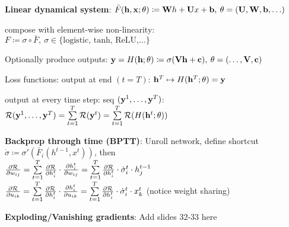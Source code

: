     \textbf{Linear dynamical system}: $\bar{F}(\mathbf h,\mathbf x;\theta)\coloneqq\mathbf W h+\mathbf U x + \mathbf b,\>\theta=(\mathbf U,\mathbf W,\mathbf b,\ldots)$
    
    compose with element-wise non-linearity:\\ \tab$F\coloneqq\sigma\circ\bar{F},\>\sigma\in\{\text{logistic, tanh, ReLU,\ldots}\}$
    
    Optionally produce outputs: $\mathbf y=H(\mathbf h;\theta)\coloneqq\sigma(\mathbf V\mathbf h+\mathbf c),\>\theta=(\ldots,\mathbf V,\mathbf c)$
    
    Loss functions: output at end $(t=T)$: $\mathbf h^T\mapsto H(\mathbf h^T;\theta)=\mathbf y$
    
    output at every time step: seq $(\mathbf y^1,\ldots,\mathbf y^T)$:\\ \tab$\mathcal{R}(\mathbf y^1,\ldots,\mathbf y^T)=\sum\limits^T_{t=1}\mathcal{R}(\mathbf y^t)=\sum\limits^T_{t=1}\mathcal{R}(H(\mathbf h^t;\theta))$
    
    \textbf{Backprop through time (BPTT)}: Unroll network, define shortcut\\ \tab$\dot{\sigma}\coloneqq\sigma'(\bar{F}_i(h^{t-1},x^t))$, then\\
    
    \tab$\frac{\partial\mathcal{R}}{\partial w_{ij}}=\sum\limits_{t=1}^{T}\frac{\partial \mathcal{R}}{\partial h^t_i}\cdot\frac{\partial h^{t}_{i}}{\partial w_{ij}}=\sum\limits_{t=1}^{T}\frac{\partial\mathcal{R}}{\partial h^t_i}\cdot\dot{\sigma}^t_i\cdot h^{t-1}_{j}$\\
    \tab$\frac{\partial\mathcal{R}}{\partial u_{ik}}=\sum\limits_{t=1}^{T}\frac{\partial \mathcal{R}}{\partial h^t_i}\cdot\frac{\partial h^{t}_{i}}{\partial u_{ik}}=\sum\limits_{t=1}^{T}\frac{\partial\mathcal{R}}{\partial h^t_i}\cdot\dot{\sigma}^t_i\cdot x^{t}_{k}$ (notice weight sharing)
    
    \textbf{Exploding/Vanishing gradients}: Add slides 32-33 here
